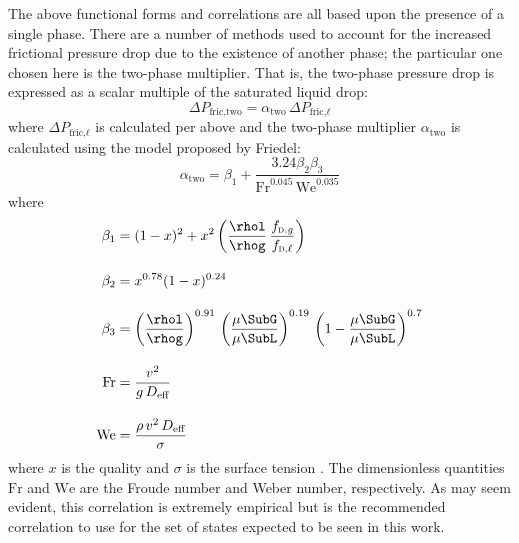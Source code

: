 The above functional forms and correlations are all based upon the presence of a single phase.
There are a number of methods used to account for the increased frictional pressure drop due to the existence of another phase; the particular one chosen here is the two-phase multiplier.
That is, the two-phase pressure drop is expressed as a scalar multiple of the saturated liquid drop:
\begin{equation}
    \Delta{P}_{\text{fric,two}} = \alpha_{\text{two}}\,\Delta{P}_{\text{fric,}\ell}
\end{equation}
where $\Delta{P}_{\text{fric,}\ell}$ is calculated per above and the two-phase multiplier $\alpha_{\text{two}}$ is calculated using the model proposed by Friedel:
\begin{equation}
    \alpha_{\text{two}} = \beta_1 + \frac{3.24 \beta_2 \beta_3}{\text{Fr}^{0.045}\,\text{We}^{0.035}}
\end{equation}
where 
\begin{align*}
    \beta_1   &= (1-x)^2 + x^2 \left( \frac{\rhol}{\rhog}\,\frac{f_{\text{\textsc{d,}}\mathit{g}}}{f_{\text{\textsc{d,}}\ell}} \right) \\[1em]
    \beta_2   &= x^{0.78} (1-x)^{0.24} \\[1em]
    \beta_3   &= \left(\frac{\rhol}{\rhog}\right)^{0.91}\,\left(\frac{\mu\SubG}{\mu\SubL}\right)^{0.19}\,\left(1 -\frac{\mu\SubG}{\mu\SubL}\right)^{0.7} \\[1em]
    \text{Fr} &= \frac{v^2}{g\,D_{\text{eff}}} \\[1em]
    \text{We} &= \frac{\rho\,v^2\,D_{\text{eff}}}{\sigma}
\end{align*}
where $x$ is the quality and $\sigma$ is the surface tension \cite{collier_convective_1994}.
The dimensionless quantities $\text{Fr}$ and $\text{We}$ are the Froude number and Weber number, respectively.
As may seem evident, this correlation is extremely empirical but is the recommended correlation to use for the set of states expected to be seen in this work.



